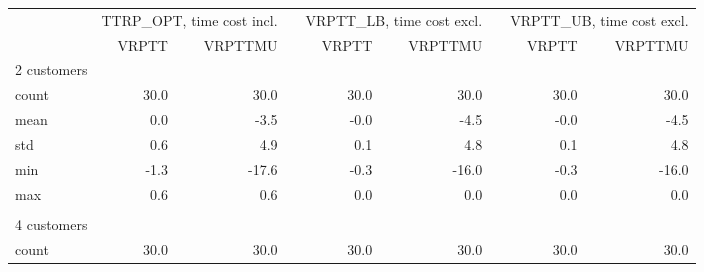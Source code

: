  \setlength\LTleft{-1.3in}
 \setlength\LTright{-1in}
 \begin{longtable}{lrrcrrcrr}
   \newpage
 \toprule
 & \multicolumn{2}{c}{TTRP\_OPT, time cost incl.} & \phantom{a}& %
 \multicolumn{2}{c}{VRPTT\_LB, time cost excl.}&\phantom{a} & \multicolumn{2}{c}{VRPTT\_UB, time cost excl.} \\
 \cmidrule{2-3} \cmidrule{5-6} \cmidrule{8-9}
  &  VRPTT &  VRPTTMU &&  VRPTT &  VRPTTMU & & VRPTT &  VRPTTMU \\
 \midrule
 2 customers \\
 \cmidrule{1-1}
 count &                30.0 &                  30.0 &&                 30.0 &                   30.0 &&                 30.0 &                   30.0 \\
 mean  &                 0.0 &                  -3.5 &&                 -0.0 &                   -4.5 &&                 -0.0 &                   -4.5 \\
 std   &                 0.6 &                   4.9 &&                  0.1 &                    4.8 &&                  0.1 &                    4.8 \\
 min   &                -1.3 &                 -17.6 &&                 -0.3 &                  -16.0 &&                 -0.3 &                  -16.0 \\
 max   &                 0.6 &                   0.6 &&                  0.0 &                    0.0 &&                  0.0 &                    0.0 \\
 \\
 4 customers \\
 \cmidrule{1-1}
 count &                30.0 &                  30.0 &&                 30.0 &                   30.0 &&                 30.0 &                   30.0 \\

\end{longtable}
